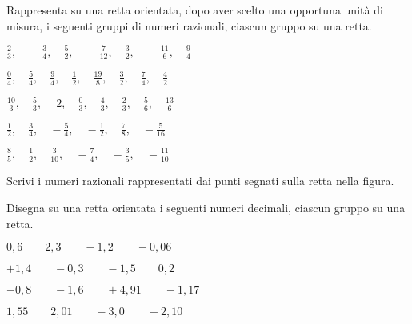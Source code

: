 \subsubsection*{}

\begin{esercizio}
 \label{ese:3.26}
Rappresenta su una retta orientata, dopo aver scelto una opportuna unità di 
misura, i seguenti gruppi di numeri razionali, ciascun gruppo su una retta.

 \begin{enumeratea}
\spazielenx
 \item 
$\displaystyle{\frac{2}{3},\quad-\frac{3}{4},\quad\frac{5}{2},\quad-\frac{7}{12}
,\quad\frac{3}{2},\quad%
-\frac{11}{6},\quad\frac{9}{4}}$
 \item 
$\displaystyle{\frac{0}{4},\quad\frac{5}{4},\quad\frac{9}{4},\quad\frac{1}{2},
\quad\frac{19}{8},\quad\frac{3}{2}%
,\quad\frac{7}{4},\quad\frac{4}{2}}$
 \item 
$\displaystyle{\frac{10}{3},\quad\frac{5}{3},\quad~2,\quad\frac{0}{3},\quad\frac
{4}{3},\quad\frac{2}{3}%
,\quad\frac{5}{6},\quad\frac{13}{6}}$
 \item 
$\displaystyle{\frac{1}{2},\quad\frac{3}{4},\quad-\frac{5}{4},\quad-\frac{1}{2},
\quad\frac{7}{8},%
\quad-\frac{5}{16}}$
\item 
$\displaystyle{\frac{8}{5},\quad\frac{1}{2},\quad\frac{3}{10},\quad-\frac{7}{4},
\quad-\frac{3}{5}%
,\quad-\frac{11}{10}}$
 \end{enumeratea}
\end{esercizio}

\begin{esercizio}
 \label{ese:3.27}
 Scrivi i numeri razionali rappresentati dai punti segnati sulla retta nella 
 figura.
\begin{center}

\end{center}

\end{esercizio}

\begin{esercizio}
 \label{ese:3.28}
Disegna su una retta orientata i seguenti numeri decimali, ciascun gruppo su 
una retta.
\begin{enumeratea}
 \item $0,6\qquad2,3\qquad-1,2\qquad-0,06$
 \item $+1,4\qquad-0,3\qquad-1,5\qquad0,2$
 \item $-0,8\qquad-1,6\qquad+4,91\qquad-1,17$
 \item $1,55\qquad2,01\qquad-3,0\qquad-2,10$
\end{enumeratea}
\end{esercizio}

